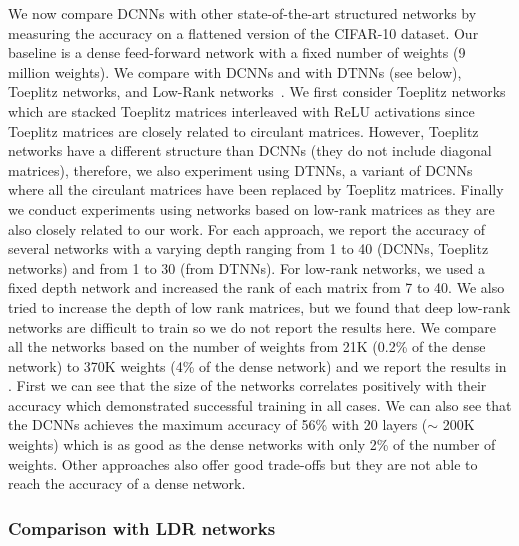 We now compare DCNNs with other state-of-the-art structured networks by measuring the accuracy on a flattened version of the CIFAR-10 dataset.
Our baseline is a dense feed-forward network with a fixed number of weights (9 million weights).
We compare with DCNNs and with DTNNs (see below), Toeplitz networks, and Low-Rank networks~\cite{yu2017compressing}.
We first consider Toeplitz networks which are stacked Toeplitz matrices interleaved with ReLU activations since Toeplitz matrices are closely related to circulant matrices.
However, Toeplitz networks have a different structure than DCNNs (they do not include diagonal matrices), therefore, we also experiment using DTNNs, a variant of DCNNs where all the circulant matrices have been replaced by Toeplitz matrices.
Finally we conduct experiments using networks based on low-rank matrices as they are also closely related to our work.
For each approach, we report the accuracy of several networks with a varying depth ranging from 1 to 40 (DCNNs, Toeplitz networks) and from 1 to 30 (from DTNNs).
For low-rank networks, we used a fixed depth network and increased the rank of each matrix from 7 to 40.
We also tried to increase the depth of low rank matrices, but we found that deep low-rank networks are difficult to train so we do not report the results here.
We compare all the networks based on the number of weights from 21K (0.2\% of the dense network) to 370K weights (4\% of the dense network) and we report the results in . 
First we can see that the size of the networks correlates positively with their accuracy which demonstrated successful training in all cases.
We can also see that the DCNNs achieves the maximum accuracy of 56\% with 20 layers ($\sim$ 200K weights) which is as good as the dense networks with only 2\% of the number of weights.
Other approaches also offer good trade-offs but they are not able to reach the accuracy of a dense network.


\subsubsection{Comparison with LDR networks}


